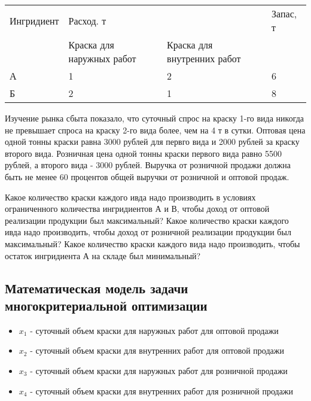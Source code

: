 \documentclass[14pt,a4paper,report]{report}
\begin{document}
\begin{table}[h!]
\begin{tabular}{|l|l|l|l|}
\hline
\multirow{}{}{Ингридиент} & \multicolumn{2}{l|}{Расход. т} &\multirow{}{}{Запас, т} \\ \cline{2-3}
                    & Краска для наружных работ & Краска для внутренних работ     &               \\ \hline
А & 1 & 2 & 6 \\ \hline
Б & 2 & 1 & 8 \\  \hline
\end{tabular}
\end{table}

Изучение рынка сбыта показало, что суточный спрос на краску 1-го вида никогда не превышает спроса на краску 2-го вида более, чем на 4 т в сутки. Оптовая цена одной тонны краски равна 3000 рублей для первго вида и 2000 рублей за краску второго вида. Розничная цена одной тонны краски первого вида равно 5500 рублей, а второго вида - 3000 рублей. Выручка от  розничной продажи должна быть не менее 60 процентов общей выручки от розничной и оптовой продаж. 

Какое количество краски каждого ивда надо производить в условиях ограниченного количества ингридиентов А и В, чтобы доход от оптовой реализации продукции был максимальный? Какое количество краски каждого ивда надо производить, чтобы доход от розничной реализации продукции был максимальный? Какое количество краски каждого вида надо производить, чтобы остаток ингридиента А на складе был минимальный?


\subsection{Математическая модель задачи многокритериальной оптимизации}

\begin{itemize}
    \item $x_1$ - суточный объем краски для наружных работ для оптовой продажи
    
    \item $x_2$ - суточный объем краски  для внутренних работ для оптовой продажи 
    
    \item $x_3$ - суточный объем краски для наружных работ для розничной продажи
    
    \item $x_4$ - суточный объем краски  для внутренних работ для розничной продажи
\end{itemize}
\end{document}

